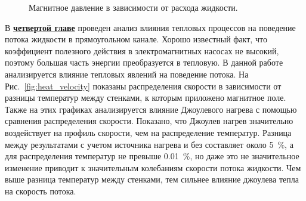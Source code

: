 \begin{figure}[h]
	\caption{Магнитное давление в зависимости от расхода жидкости.}
	\label{fig:pq_magnetic}
\end{figure}


В \underline{\textbf{четвертой главе}} проведен анализ влияния тепловых процессов на поведение потока жидкости в прямоугольном канале. Хорошо известный факт, что коэффициент полезного действия в электромагнитных насосах не высокий, поэтому большая часть энергии преобразуется в тепловую. В данной работе анализируется влияние тепловых явлений на поведение потока. На Рис.~\ref{fig:heat_velocity} показаны распределения скорости в зависимости от разницы температур между стенками, к которым приложено магнитное поле. Также на этих графиках анализируется влияние Джоулевого нагрева с помощью сравнения распределения скорости. Показано, что Джоулев нагрев значительно воздействует на профиль скорости, чем на распределение температур. Разница между результатами с учетом источника нагрева и без составляет около 5~\%, а для распределения температур не превыше 0.01~\%, но даже это не значительное изменение приводит к значительным колебаниям скорости потока жидкости. Чем выше разница температур между стенками, тем сильнее влияние джоулева тепла на скорость потока. 

